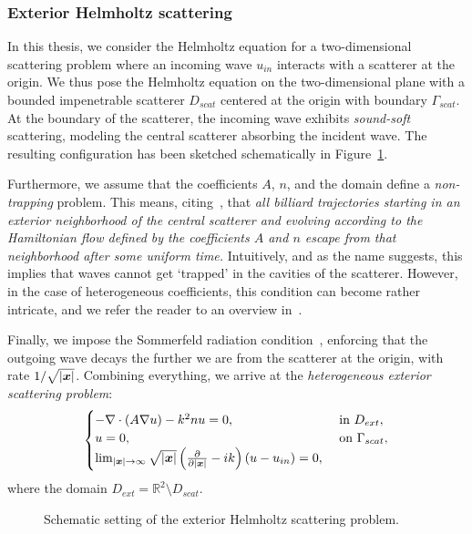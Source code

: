 \subsubsection{Exterior Helmholtz scattering}
In this thesis, we consider the Helmholtz equation for a two-dimensional scattering problem where an incoming wave $u_{in}$ interacts with a scatterer at the origin.
We thus pose the Helmholtz equation on the two-dimensional plane with a bounded impenetrable scatterer $D_{scat}$ centered at the origin with boundary $\Gamma_{scat}$.
At the boundary of the scatterer, the incoming wave exhibits \emph{sound-soft} scattering, modeling the central scatterer absorbing the incident wave.
The resulting configuration has been sketched schematically in Figure~\ref{fig:scat_tikz_R2}.

Furthermore, we assume that the coefficients $A$, $n$, and the domain define a \emph{non-trapping} problem.
This means, citing~\cite{graham2019}, that \emph{all billiard trajectories starting in an exterior neighborhood of the central scatterer and evolving according to the Hamiltonian flow defined by the coefficients $A$ and $n$ escape from that neighborhood after some uniform time.}
Intuitively, and as the name suggests, this implies that waves cannot get `trapped' in the cavities of the scatterer.
However, in the case of heterogeneous coefficients, this condition can become rather intricate, and we refer the reader to an overview in~\cite{graham2019}.

Finally, we impose the Sommerfeld radiation condition~\cite{sommerfeld1912}, enforcing that the outgoing wave decays the further we are from the scatterer at the origin, with rate $1/\sqrt {|{{\bm{x}}}|}$.
Combining everything, we arrive at the \emph{heterogeneous exterior scattering problem}:
\begin{equation*}
    \begin{cases}
        -\nabla \cdot \left( A \nabla u \right)-k^2 nu = 0, &\text{ in } D_{ext},\\
        u = 0, & \text{ on } \Gamma_{scat},\\
        \lim_{|{{\bm{x}}}|\to \infty} \sqrt {|{{\bm{x}}}|} \left( \frac{\partial}{\partial |{{\bm{x}}}|}  - ik\right) \left( u - u_{in} \right) = 0,
    \end{cases}
\end{equation*}
where the domain $D_{ext}=\mathbb{R}^2\setminus D_{scat}$.


\begin{figure}
    \centering
    \caption{Schematic setting of the exterior Helmholtz scattering problem.}
    \label{fig:scat_tikz_R2}
\end{figure}


